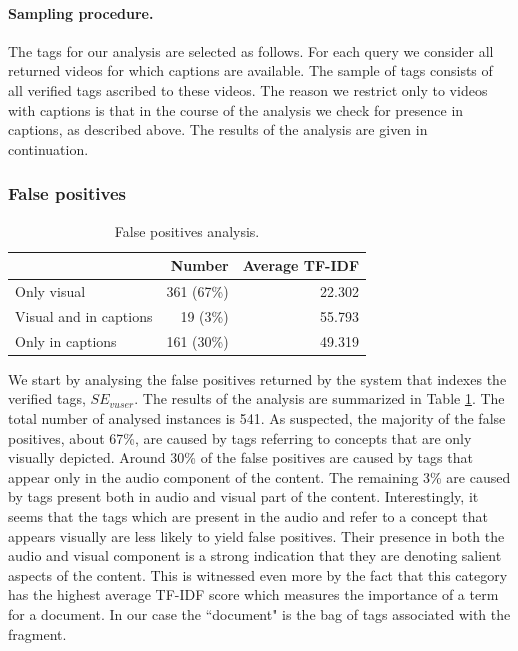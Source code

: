 \paragraph{Sampling procedure.}The tags for our analysis are selected as follows.  For each query we consider all returned videos  for which captions are available. The sample of tags consists of all verified tags ascribed to these videos. The reason we restrict only to videos with captions is that in the course of the analysis we check for presence in captions, as described above. The results of the analysis are given in continuation.

\subsubsection{False positives}

\begin{table}[tb]
\centering
\begin{footnotesize}
\begin{tabular}{l|r|r}
\toprule
 & Number & Average TF-IDF\\
 \hline
Only visual & 361 (67\%)& 22.302\\
\hline
Visual and in captions & 19 (3\%)& 55.793\\
\hline
Only in captions  & 161 (30\%)& 49.319\\
\bottomrule
\end{tabular}
\caption{False positives analysis.}
\label{topicir:table:false-pos}
\end{footnotesize}
\end{table}

We start by analysing the false positives returned by the system that indexes the verified tags, $SE_{vuser}$.  The results of the analysis are summarized in Table \ref{topicir:table:false-pos}. The total number of analysed instances is 541. As suspected, the majority of the false positives, about 67\%, are caused by tags referring to concepts that are only visually depicted. Around 30\% of the false positives are caused by tags that appear only in the audio component of the content. The remaining 3\% are caused by tags present both in audio and visual part of the content. Interestingly, it seems that the tags which are present in the audio and refer to a concept that appears visually are less likely to yield false positives. Their presence in both the audio and visual component is a strong indication that they are denoting salient aspects of the content. This is witnessed even more by the fact that this category has the highest average TF-IDF score which measures the importance of a term for a document. In our case the ``document" is the bag of tags associated with the fragment.

